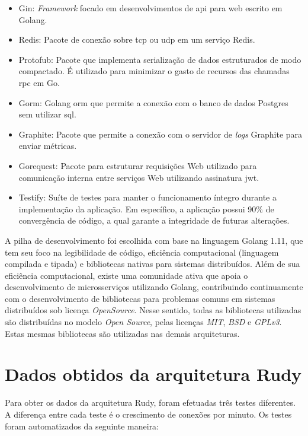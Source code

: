 \begin{itemize}
    \item Gin: \textit{Framework} focado em desenvolvimentos de \ac{api} para web escrito em Golang.
    \item Redis: Pacote de conexão sobre \ac{tcp} ou \ac{udp} em um serviço Redis.
    \item Protofub: Pacote que implementa serialização de dados estruturados de modo compactado. É utilizado para minimizar o gasto de recursos das chamadas \ac{rpc} em Go.
    \item Gorm: Golang \ac{orm} que permite a conexão com o banco de dados Postgres sem utilizar \ac{sql}.
    \item Graphite: Pacote que permite a conexão com o servidor de \textit{logs} Graphite para enviar métricas.
    \item Gorequest: Pacote para estruturar requisições Web utilizado para comunicação interna entre serviços Web utilizando assinatura \ac{jwt}.
    \item Testify: Suíte de testes para manter o funcionamento íntegro durante a implementação da aplicação. Em específico, a aplicação possui 90\% de convergência de código, a qual garante a integridade de futuras alterações.
\end{itemize}

A pilha de desenvolvimento foi escolhida com base na linguagem Golang 1.11, que tem seu foco na legibilidade de código, eficiência computacional (linguagem compilada e tipada) e bibliotecas nativas para sistemas distribuídos.
%
Além de sua eficiência computacional, existe uma comunidade ativa que apoia o desenvolvimento de microsserviços utilizando Golang, contribuindo continuamente com o desenvolvimento de bibliotecas para problemas comuns em sistemas distribuídos sob licença \textit{OpenSource}.
%
Nesse sentido, todas as bibliotecas utilizadas são distribuídas no modelo \textit{Open Source}, pelas licenças \textit{MIT}, \textit{BSD} e \textit{GPLv3}.
%
Estas mesmas bibliotecas são utilizadas nas demais arquiteturas.

 
\section{Dados obtidos da arquitetura Rudy}
\label{sec:dados_rudy}
Para obter os dados da arquitetura Rudy, foram efetuadas três testes diferentes.
%
A diferença entre cada teste é o crescimento de conexões por minuto.
%
Os testes foram automatizados da seguinte maneira:

